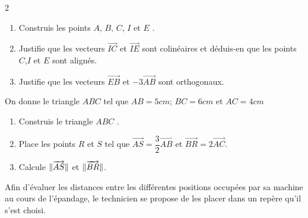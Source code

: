 \begin{multicols*}{2}
  	\begin{enumerate}
  		\item  Construis les points $A$, $B$, $C$, $I$ et $E$ .
  		\item Justifie que les vecteurs $\overrightarrow{IC}$ et $\overrightarrow{IE}$ sont colinéaires et déduis-en que les points $C$,$I$ et $E$ sont alignés.
  		\item Justifie que les vecteurs $\overrightarrow{EB}$ et $-3\overrightarrow{AB}$ sont orthogonaux.
  	\end{enumerate}
  	\begin{center}
  	\end{center}
  	On donne le triangle $ABC$ tel que $AB=5cm$; $BC=6cm$ et $AC=4cm$
  	\begin{enumerate}
  		\item  Construis le triangle $ABC$ .
  		\item Place les points $R$ et $S$ tel que $\overrightarrow{AS}=\dfrac{3}{2}\overrightarrow{AB}$ et $\overrightarrow{BR}=2\overrightarrow{AC}$.
  		\item Calcule $\Arrowvert\overrightarrow{AS}\|$ et $\Arrowvert\overrightarrow{BR}\|$.
  	\end{enumerate}
  	\setcounter{q}{0}
  	Afin d'évaluer les distances entre les différentes positions occupées par sa machine au cours de l'épandage, le technicien se propose de les placer dans un repère qu'il s'est choisi.
  	

\end{multicols*}
